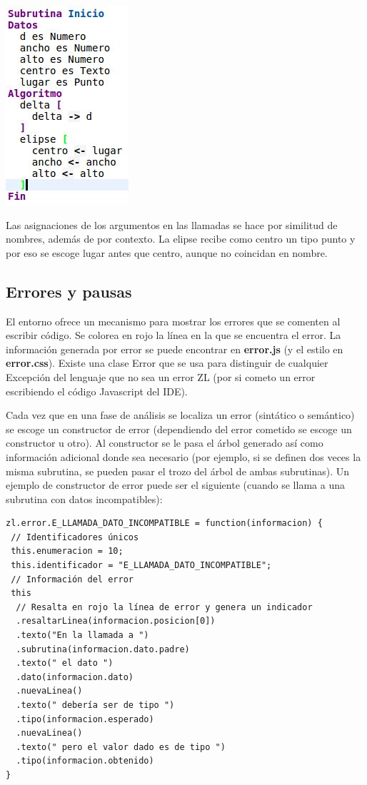 \documentclass{report}
\begin{document}
	\begin{center}
	\includegraphics{autocompletado}
	
	Las asignaciones de los argumentos en las llamadas se hace por similitud de nombres, además de por contexto. La elipse recibe como centro un tipo punto y por eso se escoge lugar antes que centro, aunque no coincidan en nombre.
	\end{center}

	
	\subsection{Errores y pausas}
	
	El entorno ofrece un mecanismo para mostrar los errores que se comenten al escribir código. Se colorea en rojo la línea en la que se encuentra el error. La información generada por error se puede encontrar en \textbf{error.js} (y el estilo en \textbf{error.css}). Existe una clase Error que se usa para distinguir de cualquier Excepción del lenguaje que no sea un error ZL (por si cometo un error escribiendo el código Javascript del IDE).
	
	\vspace{10px}
	
	Cada vez que en una fase de análisis se localiza un error (sintático o semántico) se escoge un constructor de error (dependiendo del error cometido se escoge un constructor u otro). Al constructor se le pasa el árbol generado así como información adicional donde sea necesario (por ejemplo, si se definen dos veces la misma subrutina, se pueden pasar el trozo del árbol de ambas subrutinas). Un ejemplo de constructor de error puede ser el siguiente (cuando se llama a una subrutina con datos incompatibles):
	
	\begin{BVerbatim}
zl.error.E_LLAMADA_DATO_INCOMPATIBLE = function(informacion) {
 // Identificadores únicos
 this.enumeracion = 10; 
 this.identificador = "E_LLAMADA_DATO_INCOMPATIBLE"; 
 // Información del error
 this
  // Resalta en rojo la línea de error y genera un indicador
  .resaltarLinea(informacion.posicion[0]) 
  .texto("En la llamada a ")
  .subrutina(informacion.dato.padre)
  .texto(" el dato ")
  .dato(informacion.dato)
  .nuevaLinea()
  .texto(" debería ser de tipo ")
  .tipo(informacion.esperado)
  .nuevaLinea()
  .texto(" pero el valor dado es de tipo ")
  .tipo(informacion.obtenido)
}
	\end{BVerbatim}
	
\end{document}
